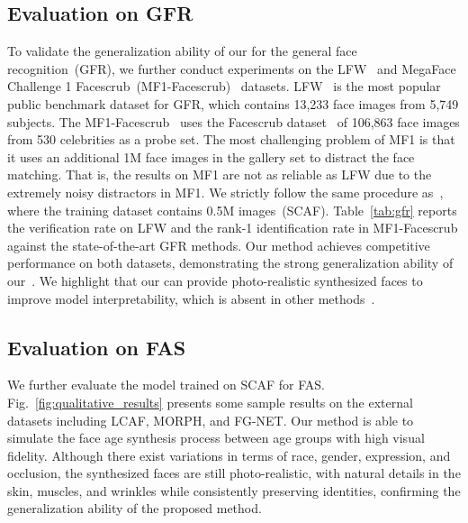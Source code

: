 \subsection{Evaluation on GFR}

To validate the generalization ability of our \methodname for the general face recognition~(GFR), we further conduct experiments on the LFW~\cite{huang2008labeled} and MegaFace Challenge 1 Facescrub~(MF1-Facescrub)~\cite{kemelmacher2016megaface} datasets. LFW~\cite{huang2008labeled} is the most popular public benchmark dataset for GFR, which contains 13,233 face images from 5,749 subjects. The MF1-Facescrub~\cite{kemelmacher2016megaface} uses the Facescrub dataset~\cite{ng2014data} of 106,863 face images from 530 celebrities as a probe set. The most challenging problem of MF1 is that it uses an additional 1M face images in the gallery set to distract the face matching. That is, the results on MF1 are not as reliable as LFW due to the extremely noisy distractors in MF1. We strictly follow the same procedure as~\cite{wang2019decorrelated,wang2018orthogonal}, where the training dataset contains 0.5M images~(SCAF). Table~\ref{tab:gfr} reports the verification rate on LFW and the rank-1 identification rate in MF1-Facescrub against the state-of-the-art GFR methods. Our method achieves competitive performance on both datasets, demonstrating the strong generalization ability of our~\methodname. We highlight that our \methodname can provide photo-realistic synthesized faces to improve model interpretability, which is absent in other methods~\cite{wang2019decorrelated,wang2018orthogonal}.

\subsection{Evaluation on FAS}\label{sec:qualitative_comparison}

We further evaluate the model trained on SCAF for FAS. Fig.~\ref{fig:qualitative_results} presents some sample results on the external datasets including LCAF, MORPH, and FG-NET. Our method is able to simulate the face age synthesis process between age groups with high visual fidelity. Although there exist variations in terms of race, gender, expression, and occlusion, the synthesized faces are still photo-realistic, with natural details in the skin, muscles, and wrinkles while consistently preserving identities, confirming the generalization ability of the proposed method.

